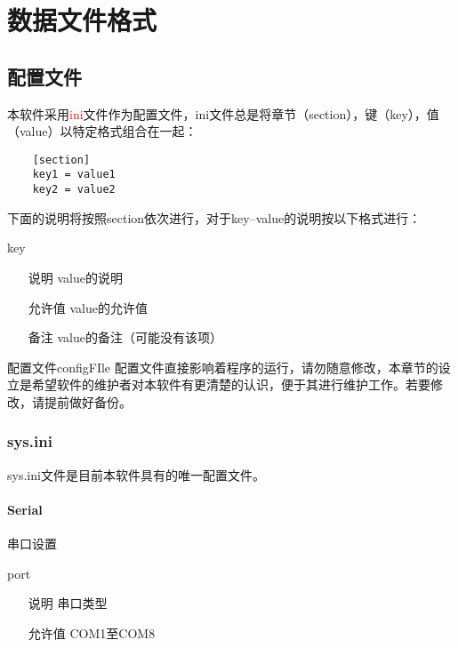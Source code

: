 \chapter{数据文件格式}

\section{配置文件}
\par 本软件采用\textcolor{red}{ini}文件作为配置文件，ini文件总是将章节（section），键（key），值（value）以特定格式组合在一起：
\begin{lstlisting}
    [section]
    key1 = value1
    key2 = value2
\end{lstlisting}
\par 下面的说明将按照section依次进行，对于key--value的说明按以下格式进行：
\begin{definition}{key}{}
    \begin{itemize}
        \item[说明] value的说明
        \item[允许值] value的允许值
        \item[备注] value的备注（可能没有该项） 
    \end{itemize}
\end{definition}

\begin{tips}{配置文件}{configFIle}
    配置文件直接影响着程序的运行，请勿随意修改，本章节的设立是希望软件的维护者对本软件有更清楚的认识，便于其进行维护工作。若要修改，请提前做好备份。
\end{tips}
\subsection{sys.ini}

sys.ini文件是目前本软件具有的唯一配置文件。
\subsubsection*{Serial}
串口设置
\begin{definition}{port}{}
    \begin{itemize}
        \item[说明] 串口类型
        \item[允许值] COM1至COM8
    \end{itemize}
\end{definition}

